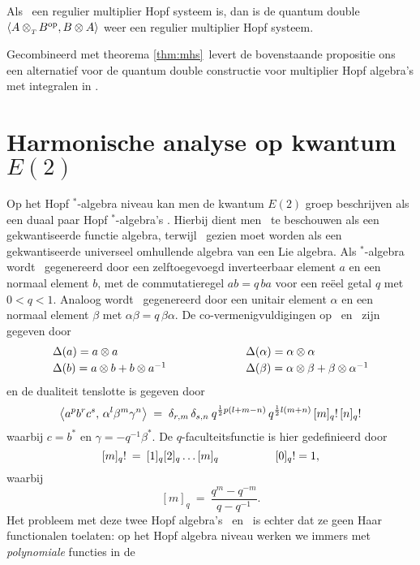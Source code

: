 \documentclass{book}
\begin{document}
\begin{prop} \label{prop:QD:rmhs}
Als\/ \pairAB\ een regulier multiplier Hopf systeem is, dan is de quantum double\/
$\langle A \otimes_{_T\!} B^{\rm op},B \otimes A \rangle$ weer een regulier multiplier Hopf systeem.
\end{prop}

Gecombineerd met theorema \ref{thm:mhs}\ levert de bovenstaande propositie ons een
alternatief voor de quantum double constructie voor multiplier Hopf algebra's met
integralen in \cite{FonsDra:QD}\@.



\section{Harmonische analyse op kwantum $E(2)$}

Op het Hopf $^*$-algebra niveau kan men de kwantum $E(2)$ groep beschrijven als
een duaal paar Hopf $^*$-algebra's \UqAq\@. Hierbij dient men \Aq\ te
beschouwen als een gekwantiseerde functie algebra, terwijl \Uq\ gezien moet
worden als een gekwantiseerde universeel omhullende algebra van een Lie
algebra. Als $^*$-algebra wordt \Uq\ gegenereerd door een zelftoegevoegd
inverteerbaar element $a$ en een normaal element $b$, met de commutatieregel
$ab = q \,ba$ voor een re\"eel getal $q$ met $0<q<1$. Analoog wordt \Aq\
gegenereerd door een unitair element $\alpha$ en een normaal element $\beta$
met $\alpha\beta = q\,\beta\alpha$.
De co-vermenigvuldigingen op \Uq\ en \Aq\ zijn gegeven door
$$ \begin{array}{lcl}
   \Delta(a) = a \tens a
&\hspace{5em}&
   \Delta(\alpha) = \alpha \tens \alpha
\\
   \Delta(b) = a \tens b + b \tens a^{-1}
&&
   \Delta(\beta) = \alpha \tens \beta + \beta \tens \alpha^{-1}
   \vertL
\end{array} $$
en de dualiteit tenslotte is gegeven door
$$  \pairM{a^p b^r c^s}{\alpha^l \beta^m \gamma^n}
        \;=\;
    \delta_{r,m}\,  \delta_{s,n} \: q^{\frac{1}{2}p(l+m-n)} \,
                         q^{\frac{1}{2}l(m+n)} \,\qfac{m}\, \qfac{n} $$
waarbij $c=b^*$ en $\gamma=-q^{-1}\beta^*$. De $q$-faculteitsfunctie is hier gedefinieerd door
$$  [m]_q!  \:=\:  [1]_q [2]_q \ldots [m]_q
                \hspace{5em} [0]_q! = 1, $$
waarbij
$$  [m]_q  \:=\:  \frac{q^m - q^{-m}}{q - q^{-1}}.  $$
Het probleem met deze twee Hopf algebra's \Aq\ en \Uq\ is echter dat ze geen
Haar functionalen toelaten:
op het Hopf algebra niveau werken we immers met {\em polynomiale\/} functies in de
\end{document}
